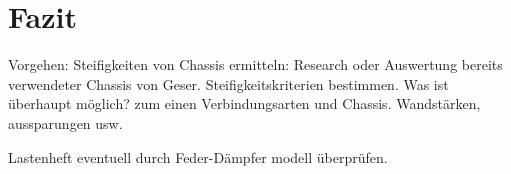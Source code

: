 
\section{Fazit}

Vorgehen:
Steifigkeiten von Chassis ermitteln: Research oder Auswertung bereits verwendeter Chassis von Geser.
Steifigkeitskriterien bestimmen.
Was ist überhaupt möglich? zum einen Verbindungsarten und Chassis. Wandstärken, aussparungen usw.

Lastenheft eventuell durch Feder-Dämpfer modell überprüfen.
